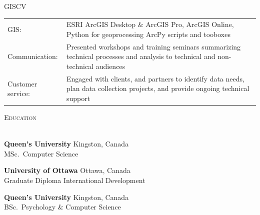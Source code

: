 \documentclass[letterpaper]{article}
\newcommand{\lineunder} {
        \vspace*{-8pt} \\
        \hspace*{-18pt} \hrulefill \\
    }
\newcommand{\header} [1] {
        \vspace{3pt}
        {\hspace*{-18pt}\vspace*{6pt} \textsc{#1}}
        \vspace*{-6pt} \lineunder
        \vspace{3pt}
    }
\newcommand{\university}[3]{
        \textbf{#1}  %
        \hfill #2\\  %
        #3\\         %
        \vspace{2mm}
    }
\newenvironment{skillslist}
        {
            \begin{tabular}[t]{ l L{5.17in} }
        }{
            \end{tabular}
        }
\begin{document}
    \begin{taggedblock}{GISCV}
        \begin{skillslist}
            GIS:& 
                ESRI ArcGIS Desktop \& ArcGIS Pro, ArcGIS Online, 
                Python for geoprocessing ArcPy scripts and tooboxes
                \\
            Communication: &
                Presented workshops and training seminars summarizing technical
                processes and analysis to technical and non-technical audiences
                \\
            Customer service: &
                Engaged with clients, and partners to identify data needs, plan data
                collection projects, and provide ongoing technical support
                \\
        \end{skillslist}
    \end{taggedblock}



\header{Education}
    \university
        {Queen's University}
        {Kingston, Canada}
        {MSc.~Computer Science}

    \university
        {University of Ottawa}
        {Ottawa, Canada}
        {Graduate Diploma International Development}

    \university
        {Queen's University}
        {Kingston, Canada}
        {BSc.~Psychology \& Computer Science}
\end{document}
